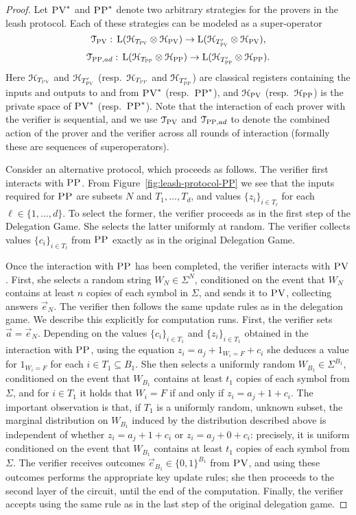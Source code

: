 \begin{proof}
Let $\textsc{PV}^*$ and $\textsc{PP}^*$ denote two arbitrary strategies for the provers in the leash protocol. Each of these strategies can be modeled as a super-operator 
$$\mathcal{T}_{\textsc{PV}}:\, \mathrm{L}(\mathcal{H}_{T_{\textsc{PV}}} \otimes \mathcal{H}_{\textsc{PV}}) \to \mathrm{L}(\mathcal{H}_{T'_{\textsc{PV}}} \otimes \mathcal{H}_{\textsc{PV}}),$$
$$\mathcal{T}_{\textsc{PP},ad}: \,\mathrm{L}(\mathcal{H}_{T_{\textsc{PP}}} \otimes \mathcal{H}_{\textsc{PP}}) \to \mathrm{L}(\mathcal{H}_{T'_{\textsc{PP}}} \otimes \mathcal{H}_{\textsc{PP}}).$$
Here $\mathcal{H}_{T_{\textsc{PV}}}$ and $\mathcal{H}_{T'_{\textsc{PV}}}$ (resp.\ $\mathcal{H}_{T_{\textsc{PP}}}$ and $\mathcal{H}_{T'_{\textsc{PP}}}$) are classical registers containing the inputs and outputs to and from $\textsc{PV}^*$ (resp.\ $\textsc{PP}^*$), and $\mathcal{H}_{\textsc{PV}}$ (resp.\ $\mathcal{H}_{\textsc{PP}}$) is the private space of $\textsc{PV}^*$ (resp.\ $\textsc{PP}^*$). Note that the interaction of each prover with the verifier is sequential, and we use $\mathcal{T}_{\textsc{PV}}$ and $\mathcal{T}_{\textsc{PP},ad}$ to denote the combined action of the prover and the verifier across all rounds of interaction (formally these are sequences of superoperators).

Consider an alternative protocol, which proceeds as follows. The verifier first interacts with $\textsc{PP}$. From Figure~\ref{fig:leash-protocol-PP} we see that the inputs required for $\textsc{PP}$ are subsets $N$ and $T_1,\ldots,T_d$, and values $\{z_i\}_{i\in T_\ell}$ for each $\ell\in\{1,\ldots,d\}$. To select the former, the verifier proceeds as in the first step of the Delegation Game. She selects the latter uniformly at random. The verifier collects values $\{c_i\}_{i\in T_\ell}$ from $\textsc{PP}$ exactly as in the original Delegation Game. 

Once the interaction with $\textsc{PP}$ has been completed, the verifier interacts with $\textsc{PV}$. First, she selects a random string $W_N\in \Sigma^N$, conditioned on the event that $W_N$ contains at least $n$ copies of each symbol in $\Sigma$, and sends it to $\textsc{PV}$, collecting answers $\vec{e}_N$. The verifier then follows the same update rules as in the delegation game. We describe this explicitly for computation runs. First, the verifier sets $\vec{a} = \vec{e}_N$. Depending on the values $\{c_i\}_{i\in T_1}$ and $\{z_i\}_{i\in T_1}$ obtained in the interaction with $\textsc{PP}$, using the equation $z_i = a_j + 1_{W_i=F}+c_i$ she deduces a value for $1_{W_i=F}$ for each $i\in T_1 \subseteq B_1$. She then selects a uniformly random $W_{B_1} \in \Sigma^{B_1}$, conditioned on the event that $W_{B_1}$ contains at least $t_1$ copies of each symbol from $\Sigma$, and for $i\in T_1$ it holds that $W_i=F$ if and only if $z_i = a_j + 1+c_i$. The important observation is that, if $T_1$ is a uniformly random, unknown subset, the marginal distribution on $W_{B_1}$ induced by the distribution described above is independent of whether $z_i = a_j + 1+c_i$ or $z_i = a_j + 0 +c_i$: precisely, it is uniform conditioned on the event that $W_{B_1}$ contains at least $t_1$ copies of each symbol from $\Sigma$. 
The verifier receives outcomes $\vec{e}_{B_1}\in \{0,1\}^{B_1}$ from $\textsc{PV}$, and using these outcomes performs the appropriate key update rules; she then proceeds to the second layer of the circuit, until the end of the computation. Finally, the verifier accepts using the same rule as in the last step of the original delegation game. 


\end{proof}
